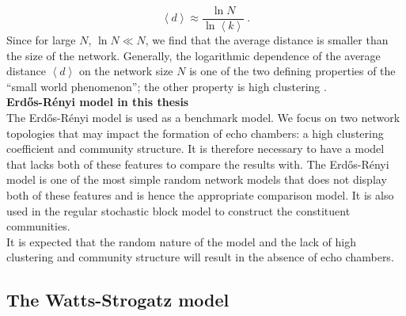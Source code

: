 \documentclass[11 pt , letterpaper , twoside , openright]{book}
\begin{document}
\begin{equation}\label{d}
	\left<d\right> \approx \frac{\ln{N}}{\ln{\left<k\right>}} \ .
\end{equation}
Since for large $N$, $\ln{N} \ll N$, we find that the average distance is smaller than the size of the network. Generally, the logarithmic dependence of the average distance $\left<d\right>$ on the network size $N$ is one of the two defining properties of the ``small world phenomenon''; the other property is high clustering \cite{Easley2010}.\\
\newline
\textbf{Erd\H{o}s-R\'{e}nyi model in this thesis}\\
\newline
The Erd\H{o}s-R\'{e}nyi model is used as a benchmark model. We focus on two network topologies that may impact the formation of echo chambers: a high clustering coefficient and community structure. It is therefore necessary to have a model that lacks both of these features to compare the results with. The Erd\H{o}s-R\'{e}nyi model is one of the most simple random network models that does not display both of these features and is hence the appropriate comparison model. It is also used in the regular stochastic block model to construct the constituent communities.\\
\newline
It is expected that the random nature of the model and the lack of high clustering and community structure will result in the absence of echo chambers.

\subsection{The Watts-Strogatz model}
\end{document}
